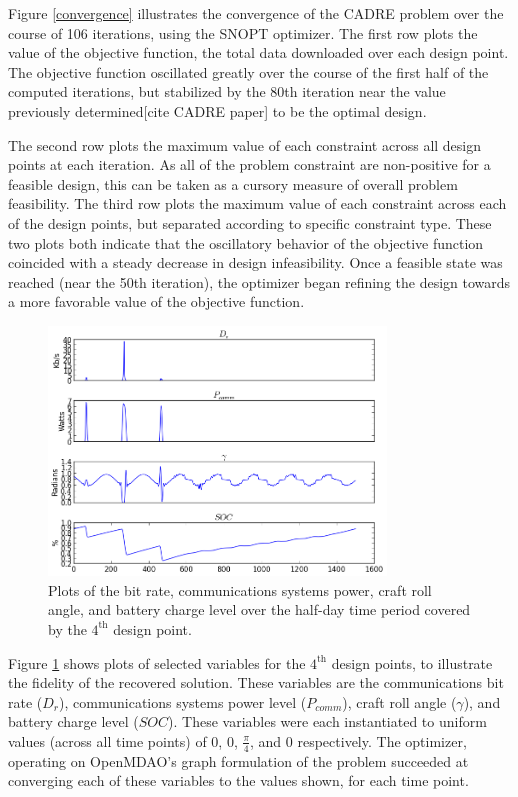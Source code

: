 \documentclass[]{aiaa-tc} %
\begin{document}
Figure \ref{convergence} illustrates the convergence of the CADRE problem over the course of
106 iterations, using the SNOPT\cite{gill2005snopt} optimizer. The first row plots the
value of the objective function, the total data downloaded over each design point. The objective
function oscillated greatly over the course of the first half of the computed iterations, but
stabilized by the 80th iteration near the value previously determined[cite CADRE paper]
to be the optimal design.

The second row plots the maximum value of each constraint across all design points at
each iteration. As all of the problem constraint are non-positive for a feasible design,
this can be taken as a cursory measure of overall problem feasibility.
The third row plots the maximum value of each constraint across each of the design points,
but separated according to specific constraint type. These two plots both indicate that the
oscillatory behavior of the objective function coincided with a steady decrease in design
infeasibility. Once a feasible state was reached (near the 50th iteration), the optimizer
began refining the design towards a more favorable value of the objective function.

\begin{figure}
\centering
\includegraphics[width=0.8\textwidth]{images/pt_3_data.png}
\caption[width=0.4\textwidth]{Plots of the bit rate, communications systems power, craft roll angle,
and battery charge level over the half-day time period covered by the $4^{\textrm{th}}$ design point.}
\label{pt3_data_results}
\end{figure}

Figure \ref{pt3_data_results} shows plots of selected variables for the $4^{\textrm{th}}$ design points,
to illustrate the fidelity of the recovered solution. These variables are the communications bit rate ($D_r$), communications systems power level ($P_{comm}$), craft roll angle ($\gamma$),
and battery charge level ($SOC$). These variables were each instantiated to uniform values
(across all time points) of 0, 0, $\frac{\pi}{4}$, and 0 respectively. The optimizer, operating on
OpenMDAO's graph formulation of the problem succeeded at converging each of these variables to the values
shown, for each time point.
\end{document}
